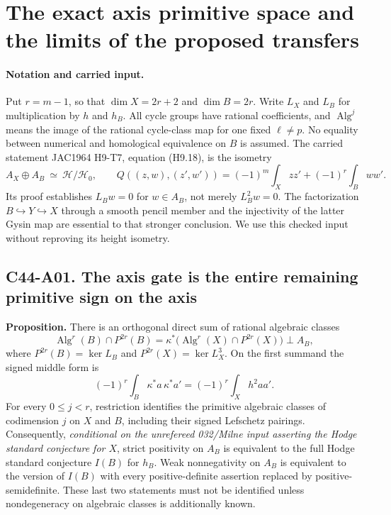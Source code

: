 \documentclass[11pt]{article}
\theoremstyle{remark}\newtheorem{remark}[theorem]{Remark}
\begin{document}
\section{The exact axis primitive space and the limits of the proposed transfers}

\paragraph{Notation and carried input.}
Put $r=m-1$, so that $\dim X=2r+2$ and $\dim B=2r$.
Write $L_X$ and $L_B$ for multiplication by $h$ and $h_B$.
All cycle groups have rational coefficients, and $\operatorname{Alg}^j$
means the image of the rational cycle-class map for one fixed
$\ell\ne p$. No equality between numerical and homological equivalence
on $B$ is assumed. The carried statement JAC1964 H9-T7, equation
(H9.18), is the isometry
\[
 A_X\oplus A_B\ \simeq\ \mathcal H/\mathcal H_0,
 \qquad
 Q((z,w),(z',w'))=(-1)^m\int_Xzz'+(-1)^r\int_Bww'.
\]
Its proof establishes $L_Bw=0$ for $w\in A_B$, not merely
$L_B^2w=0$. The factorization $B\hookrightarrow Y\hookrightarrow X$
through a smooth pencil member and the injectivity of the latter
Gysin map are essential to that stronger conclusion. We use this
checked input without reproving its height isometry.

\subsection*{C44-A01. The axis gate is the entire remaining primitive sign on the axis}

\textbf{Proposition.}
There is an orthogonal direct sum of rational algebraic classes
\[
 \operatorname{Alg}^{r}(B)\cap P^{2r}(B)
 =\kappa^*\bigl(\operatorname{Alg}^{r}(X)\cap P^{2r}(X)\bigr)
       \mathbin{\perp} A_B,                                  \tag{C44.A01.1}
\]
where $P^{2r}(B)=\ker L_B$ and $P^{2r}(X)=\ker L_X^3$.
On the first summand the signed middle form is
\[
   (-1)^r\int_B\kappa^*a\,\kappa^*a'
       =(-1)^r\int_Xh^2aa'.                                 \tag{C44.A01.2}
\]
For every $0\le j<r$, restriction identifies the primitive algebraic
classes of codimension $j$ on $X$ and $B$, including their signed
Lefschetz pairings.
Consequently, \emph{conditional on the unrefereed 032/Milne input
asserting the Hodge standard conjecture for $X$}, strict positivity
on $A_B$ is equivalent to the full Hodge standard conjecture $I(B)$
for $h_B$. Weak nonnegativity on $A_B$ is equivalent to the version
of $I(B)$ with every positive-definite assertion replaced by
positive-semidefinite. These last two statements must not be
identified unless nondegeneracy on algebraic classes is additionally
known.
\end{document}
